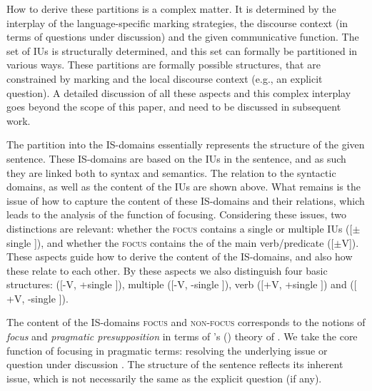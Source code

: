 \documentclass[output=paper,colorlinks,citecolor=brown]{langscibook}
\begin{document}
How to derive these partitions is a complex matter. It is determined by the interplay of the language-specific  marking strategies, the discourse context (in terms of questions under discussion) and the given communicative function. The set of IUs is structurally determined, and this set can formally be partitioned in various ways. These partitions are formally possible  structures, that are constrained by  marking and the local discourse context (e.g., an explicit question). A detailed discussion of all these aspects and this complex interplay goes beyond the scope of this paper, and need to be discussed in subsequent work. 

The partition into the IS-domains essentially represents the  structure of the given sentence. These IS-domains are based on the IUs in the sentence, and as such they are linked both to syntax and semantics. The relation to the syntactic domains, as well as the content of the IUs are shown above. What remains is the issue of how to capture the content of these IS-domains and their relations, which leads to the analysis of the function of focusing. Considering these issues, two distinctions are relevant: whether the {\textsc{focus}} contains a single  or multiple IUs ([$\pm$single ]), and whether the {\textsc{focus}} contains the  of the main verb/predicate ([$\pm$V]). These aspects guide how to derive the content of the IS-domains, and also how these relate to each other. By these aspects we also distinguish four basic  structures:  ($\lbrack$-V, +single $\rbrack$), multiple  ($\lbrack$-V, -single $\rbrack$), verb  ($\lbrack$+V, +single $\rbrack$) and  ($\lbrack$+V, -single $\rbrack$).

The content of the IS-domains {\textsc{focus}} and {\textsc{non-focus}} corresponds to the  notions of \textit{focus} and \textit{pragmatic presupposition} in terms of \citeauthor{lambrecht:94}'s (\citeyear{lambrecht:94}) theory of . We take the core function of focusing in pragmatic terms: resolving the underlying issue or question under discussion \citep[;][]{roberts:12}. The  structure of the sentence reflects its inherent issue, which is not necessarily the same as the explicit question (if any). 
\end{document}
